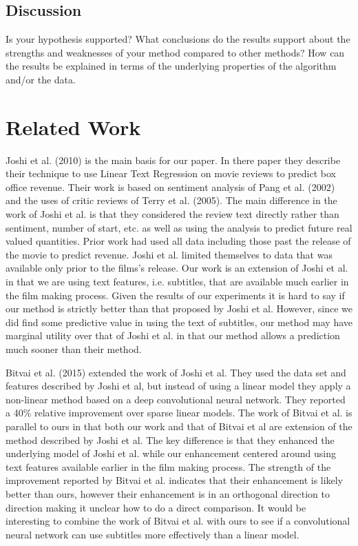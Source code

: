\documentclass[11pt]{article}
\begin{document}
\subsection{Discussion}
Is your hypothesis supported? What conclusions do the results support about the strengths
and weaknesses of your method compared to other methods? How can the results be explained
in terms of the underlying properties of the algorithm and/or the data.

\section{Related Work}
Joshi et al. (2010) is the main basis for our paper. In there paper they describe their
technique to use Linear Text Regression on movie reviews to predict box office revenue.
Their work is based on sentiment analysis of Pang et al. (2002) and the uses of critic
reviews of Terry et al. (2005). The main difference in the work of Joshi et al. is that
they considered the review text directly rather than sentiment, number of start, etc. as
well as using the analysis to predict future real valued quantities. Prior work had
used all data including those past the release of the movie to predict revenue. Joshi
et al. limited themselves to data that was available only prior to the films's release.
Our work is an extension of Joshi et al. in that we are using text features, i.e.
subtitles, that are available much earlier in the film making process. Given the results
of our experiments it is hard to say if our method is strictly better than that proposed
by Joshi et al. However, since we did find some predictive value in using the text of
subtitles, our method may have marginal utility over that of Joshi et al. in that our
method allows a prediction much sooner than their method.

Bitvai et al. (2015) extended the work of Joshi et al. They used the data set and
features described by Joshi et al, but instead of using a linear model they apply
a non-linear method based on a deep convolutional neural network. They reported a 40\%
relative improvement over sparse linear models. The work of Bitvai et al. is parallel to
ours in that both our work and that of Bitvai et al are extension of the method described
by Joshi et al. The key difference is that they enhanced the underlying model of Joshi
et al. while our enhancement centered around using text features available earlier
in the film making process. The strength of the improvement reported by Bitvai et al. indicates that their enhancement is likely better than ours, however their enhancement is
in an orthogonal direction to direction making it unclear how to do a direct comparison.
It would be interesting to combine the work of Bitvai et al. with ours to see if a
convolutional neural network can use subtitles more effectively than a linear model.
\end{document}
